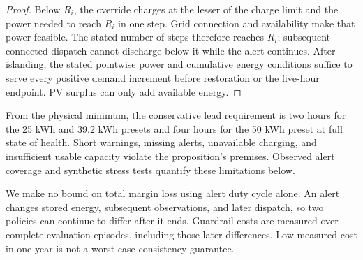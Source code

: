 \begin{proof}
Below $R_i$, the override charges at the lesser of the charge limit and the power needed to reach $R_i$ in one step. Grid connection and availability make that power feasible. The stated number of steps therefore reaches $R_i$; subsequent connected dispatch cannot discharge below it while the alert continues. After islanding, the stated pointwise power and cumulative energy conditions suffice to serve every positive demand increment before restoration or the five-hour endpoint. PV surplus can only add available energy.
\end{proof}

From the physical minimum, the conservative lead requirement is two hours for the 25 kWh and 39.2 kWh presets and four hours for the 50 kWh preset at full state of health. Short warnings, missing alerts, unavailable charging, and insufficient usable capacity violate the proposition's premises. Observed alert coverage and synthetic stress tests quantify these limitations below.

We make no bound on total margin loss using alert duty cycle alone. An alert changes stored energy, subsequent observations, and later dispatch, so two policies can continue to differ after it ends. Guardrail costs are measured over complete evaluation episodes, including those later differences. Low measured cost in one year is not a worst-case consistency guarantee.
